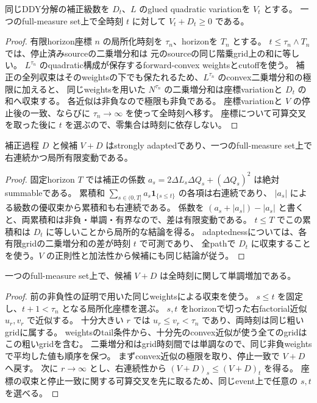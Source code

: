 \begin{lemma}[補正後の候補の非負性]
同じDDY分解の補正級数を $D_t$、$L$ のglued quadratic variationを $V_t$ とする。
一つのfull-measure set上で全時刻 $t$ に対して $V_t+D_t\geq0$ である。
\end{lemma}

\begin{proof}
有限horizon座標 $n$ の局所化時刻を $\tau_n$、horizonを $T_n$ とする。
$t\leq\tau_n\wedge T_n$ では、停止済みsourceの二乗増分和は
元のsourceの同じ階乗grid上の和に等しい。
$L^{\tau_n}$ のquadratic構成が保存するforward-convex weightsとcutoffを使う。
補正の全列収束はそのweightsの下でも保たれるため、$L^{\tau_n}$ のconvex二乗増分和の極限に加えると、
同じweightsを用いた $N^{\tau_n}$ の二乗増分和は座標variationと $D_t$ の和へ収束する。
各近似は非負なので極限も非負である。
座標variationと $V$ の停止後の一致、ならびに $\tau_n\to\infty$ を使って全時刻へ移す。
座標について可算交叉を取った後に $t$ を選ぶので、零集合は時刻に依存しない。
\end{proof}

\begin{lemma}[補正と候補の経路正則性]
補正過程 $D$ と候補 $V+D$ はstrongly adaptedであり、一つのfull-measure set上で
右連続かつ局所有限変動である。
\end{lemma}

\begin{proof}
固定horizon $T$ では補正の係数
$a_s=2\Delta L_s\Delta Q_s+(\Delta Q_s)^2$ は絶対summableである。
累積和 $\sum_{s\in(0,T]}a_s\mathbf1_{\{s\leq t\}}$ の各項は右連続であり、
$|a_s|$ による級数の優収束から累積和も右連続である。
係数を $(a_s+|a_s|)-|a_s|$ と書くと、両累積和は非負・単調・有界なので、差は有限変動である。
$t\leq T$ でこの累積和は $D_t$ に等しいことから局所的な結論を得る。
adaptednessについては、各有限gridの二乗増分和の差が時刻 $t$ で可測であり、
全pathで $D_t$ に収束することを使う。$V$ の正則性と加法性から候補にも同じ結論が従う。
\end{proof}

\begin{lemma}[補正後の候補の単調性]
一つのfull-measure set上で、候補 $V+D$ は全時刻に関して単調増加である。
\end{lemma}

\begin{proof}
前の非負性の証明で用いた同じweightsによる収束を使う。
$s\leq t$ を固定し、$t+1<\tau_n$ となる局所化座標を選ぶ。
$s,t$ をhorizonで切った右factorial近似 $u_r,v_r$ で近似する。
十分大きい $r$ では $u_r\leq v_r<\tau_n$ であり、両時刻は同じ粗いgridに属する。
weightsのtail条件から、十分先のconvex近似が使う全てのgridはこの粗いgridを含む。
二乗増分和はgrid時刻間では単調なので、同じ非負weightsで平均した値も順序を保つ。
まずconvex近似の極限を取り、停止一致で $V+D$ へ戻す。
次に $r\to\infty$ とし、右連続性から $(V+D)_s\leq(V+D)_t$ を得る。
座標の収束と停止一致に関する可算交叉を先に取るため、同じevent上で任意の $s,t$ を選べる。
\end{proof}

